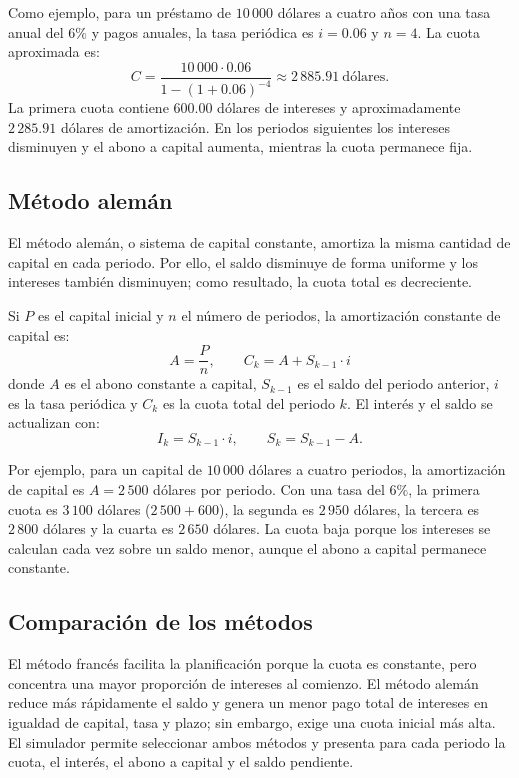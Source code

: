 \documentclass[12pt,a4paper]{article}
\begin{document}
Como ejemplo, para un préstamo de $10\,000$ dólares a cuatro años con una tasa
anual del $6\%$ y pagos anuales, la tasa periódica es $i=0.06$ y $n=4$. La
cuota aproximada es:
\[
C = \frac{10\,000 \cdot 0.06}{1-(1+0.06)^{-4}}
    \approx 2\,885.91\ \text{dólares}.
\]
La primera cuota contiene $600.00$ dólares de intereses y aproximadamente
$2\,285.91$ dólares de amortización. En los periodos siguientes los intereses
disminuyen y el abono a capital aumenta, mientras la cuota permanece fija.

\subsection{Método alemán}

El método alemán, o sistema de capital constante, amortiza la misma cantidad de
capital en cada periodo. Por ello, el saldo disminuye de forma uniforme y los
intereses también disminuyen; como resultado, la cuota total es decreciente.

Si $P$ es el capital inicial y $n$ el número de periodos, la amortización
constante de capital es:
\[
A = \frac{P}{n}, \qquad C_k = A + S_{k-1} \cdot i
\]
donde $A$ es el abono constante a capital, $S_{k-1}$ es el saldo del periodo
anterior, $i$ es la tasa periódica y $C_k$ es la cuota total del periodo $k$.
El interés y el saldo se actualizan con:
\[
I_k = S_{k-1} \cdot i, \qquad
S_k = S_{k-1} - A.
\]

Por ejemplo, para un capital de $10\,000$ dólares a cuatro periodos, la
amortización de capital es $A=2\,500$ dólares por periodo. Con una tasa del $6\%$,
la primera cuota es $3\,100$ dólares ($2\,500+600$), la segunda es $2\,950$ dólares,
la tercera es $2\,800$ dólares y la cuarta es $2\,650$ dólares. La cuota baja porque
los intereses se calculan cada vez sobre un saldo menor, aunque el abono a
capital permanece constante.

\subsection{Comparación de los métodos}

El método francés facilita la planificación porque la cuota es constante, pero
concentra una mayor proporción de intereses al comienzo. El método alemán
reduce más rápidamente el saldo y genera un menor pago total de intereses en
igualdad de capital, tasa y plazo; sin embargo, exige una cuota inicial más
alta. El simulador permite seleccionar ambos métodos y presenta para cada
periodo la cuota, el interés, el abono a capital y el saldo pendiente.
\end{document}
